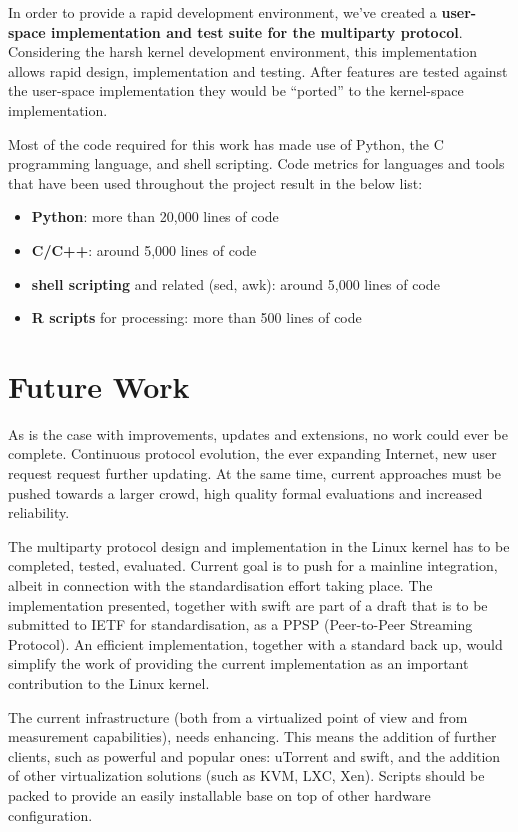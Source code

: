 In order to provide a rapid development environment, we've created a
\textbf{user-space implementation and test suite for the multiparty protocol}.
Considering the harsh kernel development environment, this implementation
allows rapid design, implementation and testing. After features are tested
against the user-space implementation they would be ``ported'' to the
kernel-space implementation.

Most of the code required for this work has made use of Python, the C
programming language, and shell scripting. Code metrics for languages and
tools that have been used throughout the project result in the below list:

\begin{itemize}
  \item \textbf{Python}: more than 20,000 lines of code
  \item \textbf{C/C++}: around 5,000 lines of code
  \item \textbf{shell scripting} and related (sed, awk): around 5,000 lines
  of code
  \item \textbf{R scripts} for processing: more than 500 lines of code
\end{itemize}

\section{Future Work}
\label{sec:conclusion:future}

As is the case with improvements, updates and extensions, no work could ever
be complete. Continuous protocol evolution, the ever expanding Internet, new
user request request further updating. At the same time, current approaches
must be pushed towards a larger crowd, high quality formal evaluations and
increased reliability.

The multiparty protocol design and implementation in the Linux kernel has to
be completed, tested, evaluated. Current goal is to push for a mainline
integration, albeit in connection with the standardisation effort taking
place. The implementation presented, together with swift are part of a draft
that is to be submitted to IETF for standardisation, as a PPSP (Peer-to-Peer
Streaming Protocol). An efficient implementation, together with a standard
back up, would simplify the work of providing the current implementation as an
important contribution to the Linux kernel.

The current infrastructure (both from a virtualized point of view and from
measurement capabilities), needs enhancing. This means the addition of further
clients, such as powerful and popular ones: uTorrent and swift, and the
addition of other virtualization solutions (such as KVM, LXC, Xen). Scripts
should be packed to provide an easily installable base on top of other
hardware configuration.

